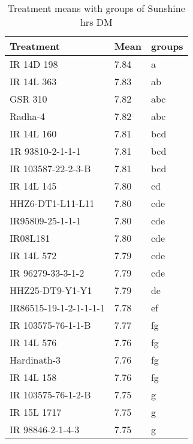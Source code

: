 \documentclass[]{article}
\begin{document}
\begin{longtable}{lll}
\caption{\label{tab:two-fac-groups-tab-agroclimate-early}Treatment means with groups of Sunshine hrs DM}\\
\toprule
Treatment & Mean & groups\\
\midrule
\rowcolor{gray!6}  IR 14D 198 & 7.84 & a\\
IR 14L 363 & 7.83 & ab\\
\rowcolor{gray!6}  GSR 310 & 7.82 & abc\\
Radha-4 & 7.82 & abc\\
\rowcolor{gray!6}  IR 14L 160 & 7.81 & bcd\\
\addlinespace
1R 93810-2-1-1-1 & 7.81 & bcd\\
\rowcolor{gray!6}  IR 103587-22-2-3-B & 7.81 & bcd\\
IR 14L 145 & 7.80 & cd\\
\rowcolor{gray!6}  HHZ6-DT1-L11-L11 & 7.80 & cde\\
IR95809-25-1-1-1 & 7.80 & cde\\
\addlinespace
\rowcolor{gray!6}  IR08L181 & 7.80 & cde\\
IR 14L 572 & 7.79 & cde\\
\rowcolor{gray!6}  IR 96279-33-3-1-2 & 7.79 & cde\\
HHZ25-DT9-Y1-Y1 & 7.79 & de\\
\rowcolor{gray!6}  IR86515-19-1-2-1-1-1-1 & 7.78 & ef\\
\addlinespace
IR 103575-76-1-1-B & 7.77 & fg\\
\rowcolor{gray!6}  IR 14L 576 & 7.76 & fg\\
Hardinath-3 & 7.76 & fg\\
\rowcolor{gray!6}  IR 14L 158 & 7.76 & fg\\
IR 103575-76-1-2-B & 7.75 & g\\
\addlinespace
\rowcolor{gray!6}  IR 15L 1717 & 7.75 & g\\
IR 98846-2-1-4-3 & 7.75 & g\\
\bottomrule
\end{longtable}
\endgroup{}
\begingroup\fontsize{12}{14}\selectfont
\end{document}
